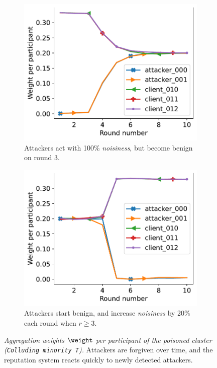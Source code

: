 \begin{figure} %
  \centering 
  \begin{subfigure}[t]{.4\linewidth}
    \centering 
    \includegraphics[trim=0 0 10pt 0,clip,width=\linewidth]{figures/reput/redemption_byzantine_min.pdf}    
    \caption{\footnotesize
      Attackers act with 100\% \emph{noisiness}, but become benign on round 3.
    }
    \label{fig:redemption_byzantine_min}
  \end{subfigure}
  \qquad
  \begin{subfigure}[t]{.4\linewidth}
    \centering 
    \includegraphics[trim=0 0 10pt 0,clip,width=\linewidth]{figures/reput/increment_byzantine_min.pdf}
    \caption{\footnotesize
      Attackers start benign, and increase \emph{noisiness} by 20\% each round when $r\geq3$.
    }
    \label{fig:increment_byzantine_min}
  \end{subfigure}
  \caption{
    \emph{Aggregation weights $\weight$ per participant of the poisoned cluster (\texttt{Colluding minority T}).}
    Attackers are forgiven over time, and the reputation system reacts quickly to newly detected attackers.
  }
  \label{fig:redemption_decrease}

\end{figure}







